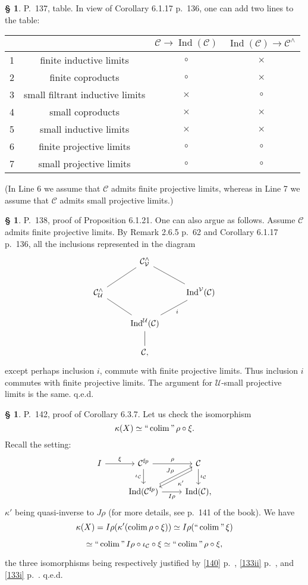 \documentclass[12pt]{article}
\theoremstyle{remark}
\theoremstyle{definition}
\newtheorem{s}[thm]{\S}
\newcommand{\C}{\mathcal C}
\newcommand{\U}{\mathcal U}
\newcommand{\V}{\mathcal V}
\DeclareMathOperator*{\coli}{colim}
\DeclareMathOperator*{\co}{colim}
\DeclareMathOperator*{\ic}{``\coli"}
\DeclareMathOperator{\Ind}{Ind}
\begin{document}
\begin{s} 
P.~137, table. In view of Corollary 6.1.17 p.~136, one can add two lines to the table:\bigskip 

\begin{center}
\begin{tabular}{|c|c|c|c|}\hline
&&$\C\to\Ind(\C)$&$\Ind(\C)\to\C^\wedge$\\ \hline
1&finite inductive limits&$\circ$&$\times$\\ \hline
2&finite coproducts&$\circ$&$\times$\\ \hline
3&small filtrant inductive limits&$\times$&$\circ$\\ \hline
4&small coproducts&$\times$&$\times$\\ \hline
5&small inductive limits&$\times$&$\times$\\ \hline
6&finite projective limits&$\circ$&$\circ$\\ \hline
7&small projective limits&$\circ$&$\circ$\\ \hline
\end{tabular}
\end{center}%
\noindent(In Line 6 we assume that $\C$ admits finite projective limits, whereas in Line 7 we assume that $\C$ admits small projective limits.)%
\end{s}
%
%
\begin{s} 
P.~138, proof of Proposition 6.1.21. One can also argue as follows. Assume $\C$ admits finite projective limits. By Remark 2.6.5 p.~62 and Corollary 6.1.17 p.~136, all the inclusions represented in the diagram 
\[
\begin{tikzcd}
{}&\C^\wedge_\V\ar[-]{ld}\ar[-]{rd}\\
\C^\wedge_\U\ar[-]{rd}&&\Ind^\V(\C)\ar[-]{ld}{i}\\
&\Ind^\U(\C)\ar[-]{d}\\
&\C,
\end{tikzcd}
\]
except perhaps inclusion $i$, commute with finite projective limits. Thus inclusion $i$ commutes with finite projective limits. The argument for $\U$-small projective limits is the same. q.e.d.
\end{s}
%
%
\begin{s} P.~142, proof of Corollary 6.3.7. Let us check the isomorphism 
$$
\kappa(X)\simeq\ic\rho\circ\xi. 
$$ 
Recall the setting:
$$
\begin{tikzcd}
I\ar{r}{\xi}&\C^{\text fp}\ar{d}[swap]{\iota_\C}\ar{r}{\rho}&\C\ar[yshift=-.9ex]{dl}{\kappa'}\ar{d}{\iota_\C}\\ 
{}&\Ind(\C^{\text fp})\ar{ur}{J\rho}\ar{r}[swap]{I\rho}&\Ind(\C),
\end{tikzcd}
$$ 
$\kappa'$ being quasi-inverse to $J\rho$ (for more details, see p.~141 of the book). We have 
$$
\kappa(X)=I\rho(\kappa'(\co\rho\circ\xi))\simeq I\rho(\ic\xi)
$$

$$
\simeq\ic I\rho\circ\iota_\C\circ\xi\simeq\ic\rho\circ\xi, 
$$ 

\noindent the three isomorphisms being respectively justified by \eqref{140} p.~\pageref{140}, \eqref{133ii} p.~\pageref{133ii}, and \eqref{133i} p.~\pageref{133i}. q.e.d.
\end{s}
%
%
\end{document}
